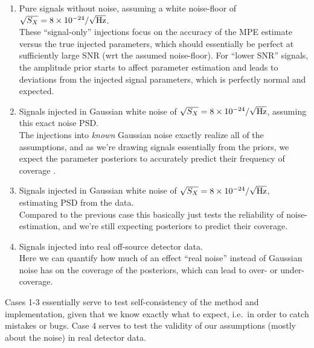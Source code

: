 \documentclass[aps,prd,onecolumn,notitlepage,nofootinbib,superscriptaddress,altaffilletter,floatfix]{revtex4-1}
\begin{document}
\begin{enumerate}

\item Pure signals without noise, assuming a white noise-floor of $\sqrt{S_X} = 8\times10^{-24}/\sqrt{\mathrm{Hz}}$.\\[0.2cm]
  These ``signal-only'' injections focus on the accuracy of the MPE estimate versus the true injected parameters, which should essentially be
  perfect at sufficiently large SNR (wrt the assumed noise-floor). For ``lower SNR'' signals, the amplitude prior starts to affect parameter estimation
  and leads to deviations from the injected signal parameters, which is perfectly normal and expected.

\item Signals injected in Gaussian white noise of $\sqrt{S_X} = 8\times10^{-24}/\sqrt{\mathrm{Hz}}$, assuming this exact noise PSD.\\[0.2cm]
  The injections into \emph{known} Gaussian noise exactly realize all of the assumptions, and as we're drawing signals essentially from the
  priors, we expect the parameter posteriors to accurately predict their frequency of coverage \citep[e.g.\ see][]{2008arXiv0804.1161S}.

\item Signals injected in Gaussian white noise of $\sqrt{S_X} = 8\times10^{-24}/\sqrt{\mathrm{Hz}}$, estimating PSD from the data.\\[0.2cm]
  Compared to the previous case this basically just tests the reliability of noise-estimation, and we're still expecting posteriors to predict their
  coverage.

\item Signals injected into real off-source detector data.\\[0.2cm]
  Here we can quantify how much of an effect ``real noise'' instead of Gaussian noise has on the coverage of the posteriors, which can lead to over-
  or under-coverage.

\end{enumerate}

Cases 1-3 essentially serve to test self-consistency of the method and implementation, given that we know exactly what to expect, i.e.\ in order to
catch mistakes or bugs. Case 4 serves to test the validity of our assumptions (mostly about the noise) in real detector data.

\newcommand{\InjSignalOnlyPriorRangesDir}{./Results/Results-160408-19h21-injections10000-data20Hz-1900Hz-Prior-f200Hz-300Hz-df0.5Hz-tau0.5ms-20.0ms-dtau0.5ms-H2.0-10.0-dH1.0-injectPriorRanges-injectSqrtSX_0_0-assumeSqrtSX_8e-24_8e-24}
\newcommand{\InjKnownGaussPriorRangesDir}{./Results/Results-160408-21h14-injections10000-data20Hz-1900Hz-Prior-f200Hz-300Hz-df0.5Hz-tau0.5ms-20.0ms-dtau0.5ms-H2.0-10.0-dH1.0-injectPriorRanges-injectSqrtSX_8e-24_8e-24-assumeSqrtSX_8e-24_8e-24}
\newcommand{\InjUnknownGaussPriorRangesDir}{./Results/Results-160408-23h07-injections10000-data20Hz-1900Hz-Prior-f200Hz-300Hz-df0.5Hz-tau0.5ms-20.0ms-dtau0.5ms-H2.0-10.0-dH1.0-injectPriorRanges-injectSqrtSX_8e-24_8e-24}
\newcommand{\InjOffSourcePriorRangesDir}{./Results/Results-160409-01h00-injections10000-data20Hz-1900Hz-Prior-f200Hz-300Hz-df0.5Hz-tau0.5ms-20.0ms-dtau0.5ms-H2.0-10.0-dH1.0-injectPriorRanges}
\end{document}
